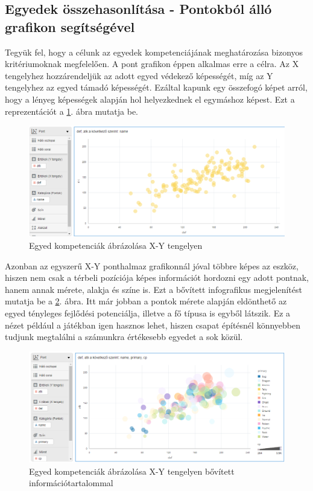 	\subsection{Egyedek összehasonlítása - Pontokból álló grafikon segítségével}
	Tegyük fel, hogy a célunk az egyedek kompetenciájának meghatározása bizonyos kritériumoknak megfelelően. A pont grafikon éppen alkalmas erre a célra. Az X tengelyhez hozzárendeljük az adott egyed védekező képességét, míg az Y tengelyhez az egyed támadó képességét. Ezáltal kapunk egy összefogó képet arról, hogy a lényeg képességek alapján hol helyezkednek el egymáshoz képest. Ezt a reprezentációt a \ref{fig:pokedata1}. ábra mutatja be.
	\begin{figure}[h!]
		\centering
		\includegraphics[width=0.85\linewidth]{dani_imgs/poke_data1}
		\caption{Egyed kompetenciák ábrázolása X-Y tengelyen}
		\label{fig:pokedata1}
	\end{figure}
	
	Azonban az egyszerű X-Y ponthalmaz grafikonnál jóval többre képes az eszköz, hiszen nem csak a térbeli pozíciója képes információt hordozni egy adott pontnak, hanem annak mérete, alakja és színe is. Ezt a bővített infografikus megjelenítést mutatja be a \ref{fig:pokedata2}. ábra. Itt már jobban a pontok mérete alapján eldönthető az egyed tényleges fejlődési potenciálja, illetve a fő típusa is egyből látszik. Ez a nézet például a játékban igen hasznos lehet, hiszen csapat építésnél könnyebben tudjunk megtalálni a számunkra értékesebb egyedet a sok közül.
	\begin{figure}[h!]
		\centering
		\includegraphics[width=0.85\linewidth]{dani_imgs/poke_data2}
		\caption{Egyed kompetenciák ábrázolása X-Y tengelyen bővített információtartalommal}
		\label{fig:pokedata2}
	\end{figure}

